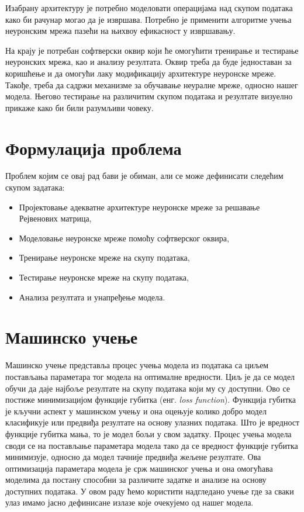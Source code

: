 \documentclass[a4paper, 12pt, master, utf8]{etf}
\begin{document}
Изабрану архитектуру је потребно моделовати операцијама над скупом података како би рачунар могао да је извршава. Потребно је применити алгоритме учења неуронским мрежа пазећи на њихвоу ефикасност у извршавању.
\newline

На крају је потребан софтверски оквир који ће омогућити тренирање и тестирање неуронских мрежа, као и анализу резултата. 
Оквир треба да буде једноставан за коришћење и да омогући лаку модификацију архитектуре неуронске 
мреже. Такође, треба да садржи механизме за обучавање неуралне мреже, односно нашег модела. Његово тестирање на различитим скупом података и 
резултате визуелно прикаже како би били разумљиви човеку.

\section{Формулација проблема}
\label{sec:21}
Проблем којим се овај рад бави је обиман, али се може дефинисати следећим скупом задатака:

\begin{itemize}[noitemsep]
    \item  Пројектовање адекватне архитектуре неуронске мреже за решавање Рејвенових матрица,
    \item  Моделовање неуронске мреже помоћу софтверског оквира,
    \item  Тренирање неуронске мреже на скупу података,
    \item  Тестирање неуронске мреже на скупу података,
    \item  Анализа резултата и унапређење модела.
\end{itemize}

\section{Машинско учење}
\label{sec:22}
Машинско учење представља процес учења модела из података са циљем постављања параметара тог модела 
на оптималне вредности. Циљ је да се модел обучи да даје најбоље резултате на скупу података који му 
су доступни. Ово се постиже минимизацијом функције губитка (енг. \textit{loss function}). 
Функција губитка је кључни аспект у машинском учењу и она оцењује колико добро модел класификује 
или предвиђа резултате на основу улазних података. Што је вредност функције губитка мања, то је модел бољи у свом задатку. 
Процес учења модела своди се на постављање параметара модела тако да се 
вредност функције губитка минимизује, односно да модел тачније предвиђа жељене резултате. 
Ова оптимизација параметара модела је срж машинског учења и она омогућава моделима да постану 
способни за различите задатке и анализе на основу доступних података. 
У овом раду ћемо користити надгледано учење где
за сваки улаз имамо јасно дефинисане излазе које очекујемо од нашег модела.
\newline
\end{document}
